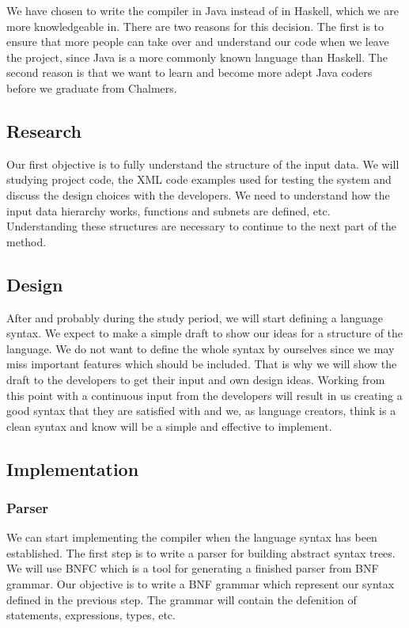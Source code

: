 \documentclass[a4paper]{article}
\begin{document}
We have chosen to write the compiler in Java instead of in Haskell,
which we are more knowledgeable in. There are two reasons for this
decision. The first is to ensure that more people can take over and
understand our code when we leave the project, since Java is a more
commonly known language than Haskell. The second reason is that we
want to learn and become more adept Java coders before we graduate
from Chalmers.


\subsection{Research}
Our first objective is to fully understand the structure of the input
data. We will studying project code, the XML code examples used for
testing the system and discuss the design choices with the
developers. We need to understand how the input data hierarchy works,
functions and subnets are defined, etc. Understanding these structures
are necessary to continue to the next part of the method.

\subsection{Design}
After and probably during the study period, we will start defining a
language syntax. We expect to make a simple draft to show our ideas
for a structure of the language. We do not want to define the whole
syntax by ourselves since we may miss important features which should
be included. That is why we will show the draft to the developers to
get their input and own design ideas. Working from this point with a
continuous input from the developers will result in us creating a good
syntax that they are satisfied with and we, as language creators,
think is a clean syntax and know will be a simple and effective to
implement.

\subsection{Implementation}
\subsubsection{Parser}
We can start implementing the compiler when the language syntax has
been established. The first step is to write a parser for building
abstract syntax trees. We will use BNFC which is a tool for generating
a finished parser from BNF grammar. Our objective is to write a BNF
grammar which represent our syntax defined in the previous step. The
grammar will contain the defenition of statements, expressions, types,
etc.
\end{document}
